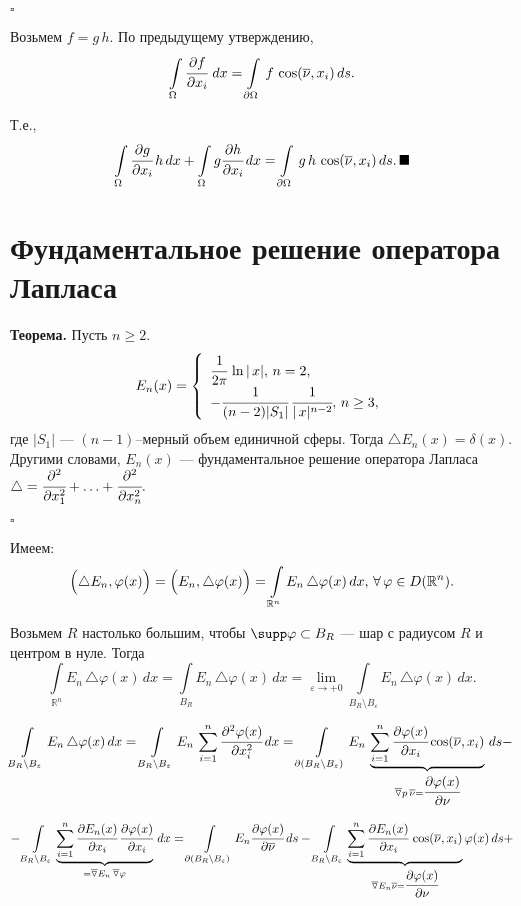 \documentclass[unicode,12pt,draft]{article}
\begin{document}
$\square$

Возьмем $f=g\,h$. По предыдущему утверждению,
$$\int\limits_{\Omega}\cfrac{\partial f}{\partial
x_i}\,\,dx=
\int\limits_{\partial\Omega}\,f\,\cos(\overline{\nu},x_i)\,ds.$$

Т.е.,
$$\int\limits_{\Omega}\cfrac{\partial g}{\partial
x_i}\,h\,dx+\int\limits_{\Omega}g\cfrac{\partial h}{\partial
x_i}\,dx=
\int\limits_{\partial\Omega}\,g\,h\,\cos(\overline{\nu},x_i)\,ds.\,\blacksquare$$

\section{Фундаментальное решение оператора Лапласа}

\textbf{Теорема.} Пусть $n\ge2$.
$$E_n(x)=\left\{%
\begin{array}{ll}
    \cfrac1{2\pi}\,\ln|\,x|,\,n=2,      \\
    -\cfrac1{(n-2)|S_1|}\,\cfrac1{|\,x|^{n-2}},\,n\ge3, \\
\end{array}%
\right.    $$ где $|S_1|$ --- $(n-1)$--мерный объем единичной
сферы. Тогда $\triangle E_n(x)=\delta(x).$ Другими словами,
$E_n(x)$ --- фундаментальное решение оператора Лапласа $\triangle
=\cfrac{\partial^2 }{\partial x_1^2}+\ldots+\cfrac{\partial^2
}{\partial x_n^2}.$

$\square$

Имеем: $$\Bigl(\triangle E_n,\varphi(x)\Bigr)=
\Bigl(E_n,\triangle\varphi(x)\Bigr)= \int\limits_{\mathbb
R^n}E_n\,\triangle\varphi(x)\,dx,\,\forall \,\varphi \in D(\mathbb
R^n).$$

Возьмем $R$ настолько большим, чтобы $\supp \varphi\subset B_R$
--- шар с радиусом $R$ и центром в нуле. Тогда
$$\int\limits_{\mathbb
R^n}E_n\,\triangle\varphi(x)\,dx=
\int\limits_{B_R}E_n\,\triangle\varphi(x)\,dx=
\lim_{\varepsilon\to+0}\int\limits_{B_R\setminus
B_{\varepsilon}}E_n\,\triangle\varphi(x)\,dx.$$

$$\int\limits_{B_R\setminus
B_{\varepsilon}}E_n\,\triangle\varphi(x)\,dx=
\int\limits_{B_R\setminus
B_{\varepsilon}}E_n\,\sum_{i=1}^n\cfrac{\partial^2\varphi(x)}{\partial
x_i^2}\,dx= \int\limits_{\partial (B_R\setminus
B_{\varepsilon})}E_n\,\underbrace{\sum_{i=1}^n\cfrac{\partial\varphi(x)}{\partial
x_i}\cos(\overline{\nu},x_i)}_{\overline{\triangledown}
p\,\overline{\nu}=\cfrac{\partial\varphi(x)}{\partial \nu}}\,ds-$$

$$-\int\limits_{B_R\setminus
B_{\varepsilon}}\underbrace{\sum_{i=1}^n\cfrac{\partial
E_n(x)}{\partial x_i}\,\cfrac{\partial\varphi(x)}{\partial
x_i}}_{=\overline{\triangledown}E_n\,\overline{\triangledown}\varphi}\,dx=
\int\limits_{\partial (B_R\setminus
B_{\varepsilon})}E_n\cfrac{\partial\varphi(x)}{\partial
\overline{\nu}}\,ds- \int\limits_{B_R\setminus
B_{\varepsilon}}\underbrace{\sum_{i=1}^n\cfrac{\partial
E_n(x)}{\partial
x_i}\,\cos(\overline{\nu},x_i)}_{\overline{\triangledown}
E_n\overline{\nu}=\cfrac{\partial\varphi(x)}{\partial
\nu}}\varphi(x)\,ds+$$
\end{document}
